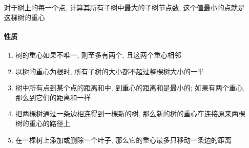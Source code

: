 对于树上的每一个点, 计算其所有子树中最大的子树节点数, 这个值最小的点就是这棵树的重心

\paragraph{性质}

\begin{enumerate}
    \item 树的重心如果不唯一, 则至多有两个, 且这两个重心相邻
    \item 以树的重心为根时, 所有子树的大小都不超过整棵树大小的一半
    \item 树中所有点到某个点的距离和中, 到重心的距离和是最小的; 如果有两个重心, 那么到它们的距离和一样
    \item 把两棵树通过一条边相连得到一棵新的树, 那么新的树的重心在连接原来两棵树的重心的路径上
    \item 在一棵树上添加或删除一个叶子, 那么它的重心最多只移动一条边的距离
\end{enumerate}
